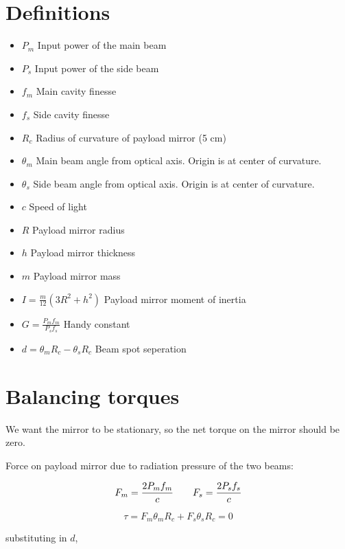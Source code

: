 %

\section{Definitions}
\begin{itemize}
\item $P_m$ Input power of the main beam 
\item $P_s$ Input power of the side beam
\item $f_m$ Main cavity finesse
\item $f_s$ Side cavity finesse
\item $R_c$ Radius of curvature of payload mirror (5 cm)
\item $\theta_m$ Main beam angle from optical axis.  Origin is at center of curvature.
\item $\theta_s$ Side beam angle from optical axis.  Origin is at center of curvature.
\item $c$ Speed of light
\item $R$ Payload mirror radius
\item $h$ Payload mirror thickness
\item $m$ Payload mirror mass
\item $I = \frac{m}{12}(3R^2+h^2)$ Payload mirror moment of inertia
\item $G = \frac{P_mf_m}{P_sf_s}$ Handy constant
\item $d = \theta_mR_c - \theta_sR_c$ Beam spot seperation
\end{itemize}


\newpage
\section{Balancing torques}
We want the mirror to be stationary, so the net torque on the mirror should be zero.

Force on payload mirror due to radiation pressure of the two beams:

$$ F_m = \frac{2P_mf_m}{c} \hspace{20 pt} F_s = \frac{2P_sf_s}{c}$$

$$\tau = F_m\theta_mR_c+F_s\theta_sR_c = 0$$

substituting in $d$,

